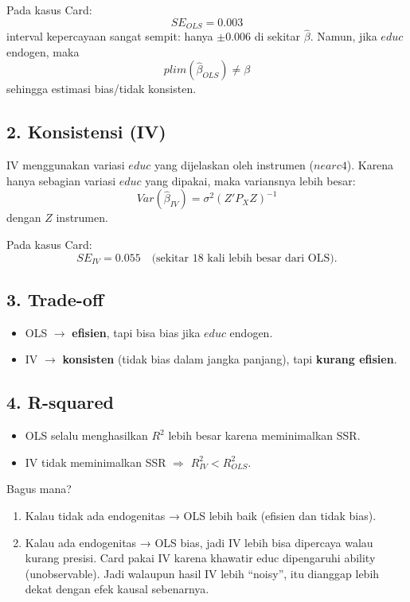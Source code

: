\documentclass[]{article}
\begin{document}
Pada kasus Card:  
\[
SE_{OLS} = 0.003
\]
interval kepercayaan sangat sempit: hanya $\pm 0.006$ di sekitar $\hat{\beta}$.  
Namun, jika $educ$ endogen, maka
\[
plim(\hat{\beta}_{OLS}) \neq \beta
\]
sehingga estimasi bias/tidak konsisten.

\subsection*{2. Konsistensi (IV)}
IV menggunakan variasi $educ$ yang dijelaskan oleh instrumen ($nearc4$).  
Karena hanya sebagian variasi $educ$ yang dipakai, maka variansnya lebih besar:
\[
Var(\hat{\beta}_{IV}) = \sigma^2 (Z'P_X Z)^{-1}
\]
dengan $Z$ instrumen.  

Pada kasus Card:  
\[
SE_{IV} = 0.055 \quad \text{(sekitar 18 kali lebih besar dari OLS)}.
\]

\subsection*{3. Trade-off}
\begin{itemize}
    \item OLS $\rightarrow$ \textbf{efisien}, tapi bisa bias jika $educ$ endogen.
    \item IV $\rightarrow$ \textbf{konsisten} (tidak bias dalam jangka panjang), tapi \textbf{kurang efisien}.
\end{itemize}

\subsection*{4. R-squared}
\begin{itemize}
    \item OLS selalu menghasilkan $R^2$ lebih besar karena meminimalkan SSR.
    \item IV tidak meminimalkan SSR $\Rightarrow$ $R^2_{IV} < R^2_{OLS}$.
\end{itemize}

Bagus mana?
\begin{enumerate}
    \item Kalau tidak ada endogenitas → OLS lebih baik (efisien dan tidak bias).
\item Kalau ada endogenitas → OLS bias, jadi IV lebih bisa dipercaya walau kurang presisi.
Card pakai IV karena khawatir educ dipengaruhi ability (unobservable). Jadi walaupun hasil IV lebih “noisy”, itu dianggap lebih dekat dengan efek kausal sebenarnya.

\end{enumerate}
\end{document}
